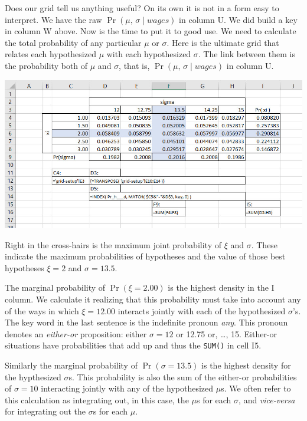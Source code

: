 \documentclass[
]{book}
\begin{document}
Does our grid tell us anything useful? On its own it is not in a form easy to interpret. We have the raw \(\operatorname{Pr}(\mu,\,\sigma \mid wages)\) in column U. We did build a key in column W above. Now is the time to put it to good use. We need to calculate the total probability of any particular \(\mu\) or \(\sigma\). Here is the ultimate grid that relates each hypothesized \(\mu\) with each hypothesized \(\sigma\). The link between them is the probability both of \(\mu\) and \(\sigma\), that is, \(\operatorname{Pr}(\mu,\,\sigma \mid wages)\) in column U.

\includegraphics{images/06/claims-xi-sigma.jpg}

Right in the cross-hairs is the maximum joint probability of \(\xi\) and \(\sigma\). These indicate the maximum probabilities of hypotheses and the value of those best hypotheses \(\xi=2\) and \(\sigma=13.5\).

The marginal probability of \(\operatorname{Pr}( \xi = 2.00)\) is the highest density in the I column. We calculate it realizing that this probability must take into account any of the ways in which \(\xi=12.00\) interacts jointly with each of the hypothesized \(\sigma\)'s. The key word in the last sentence is the indefinite pronoun \emph{any}. This pronoun denotes an \emph{either-or} proposition: either \(\sigma=12\) or 12.75 or, \ldots, 15. Either-or situations have probabilities that add up and thus the \texttt{SUM()} in cell I5.

Similarly the marginal probability of \(\operatorname{Pr}(\sigma = 13.5 )\) is the highest density for the hypthesized \(\sigma\)s. This probability is also the sum of the either-or probabilities of \(\sigma = 10\) interacting jointly with any of the hypothesized \(\mu\)s. We often refer to this calculation as integrating out, in this case, the \(\mu\)s for each \(\sigma\), and \emph{vice-versa} for integrating out the \(\sigma\)s for each \(\mu\).
\end{document}
